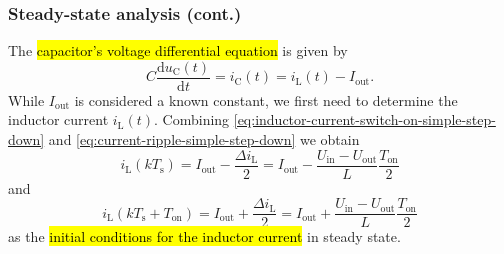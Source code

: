 \begin{frame}
    \frametitle{Steady-state analysis (cont.)}
     The \hl{capacitor's voltage differential equation} is given by
    \begin{equation}
        C \frac{\mathrm{d}u_\mathrm{C}(t)}{\mathrm{d}t} = i_\mathrm{C}(t) = i_\mathrm{L}(t) - I_\mathrm{out}.
        \label{eq:capacitor-voltage-differential-equation-step-down-converter}
    \end{equation}
    While $I_\mathrm{out}$ is considered a known constant, we first need to determine the inductor current $i_\mathrm{L}(t)$. Combining \eqref{eq:inductor-current-switch-on-simple-step-down} and \eqref{eq:current-ripple-simple-step-down} we obtain
    \begin{equation}
         i_\mathrm{L}(k T_\mathrm{s})  = I_\mathrm{out} - \frac{\Delta i_\mathrm{L}}{2} = I_\mathrm{out} - \frac{U_\mathrm{in} - U_\mathrm{out}}{L} \frac{T_\mathrm{on}}{2}
    \end{equation}
    and
    \begin{equation}
        i_\mathrm{L}(k T_\mathrm{s} + T_\mathrm{on})  = I_\mathrm{out} + \frac{\Delta i_\mathrm{L}}{2} = I_\mathrm{out} + \frac{U_\mathrm{in} - U_\mathrm{out}}{L} \frac{T_\mathrm{on}}{2}
   \end{equation}
    as the \hl{initial conditions for the inductor current} in steady state. 
\end{frame}


